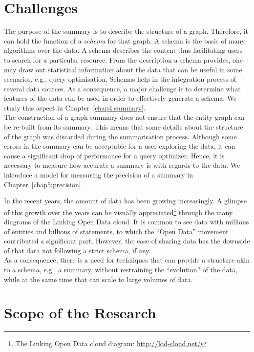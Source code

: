 \section{Challenges}

The purpose of the summary is to describe the structure of a graph. Therefore, it can hold the function of a \emph{schema} for that graph.
A schema is the basis of many algorithms over the data. A schema describes the content thus facilitating users to search for a particular resource. From the description a schema provides, one may draw out statistical information about the data that can be useful in some scenarios, e.g., query optimisation. Schemas help in the integration process of several data sources. As a consequence, a major challenge is to determine what features of the data can be used in order to effectively generate a schema. We study this aspect in Chapter~\ref{chap4:summary}.\\

The construction of a graph summary does not ensure that the entity graph can be re-built from its summary. This means that some details about the structure of the graph was discarded during the summarisation process. Although some errors in the summary can be acceptable for a user exploring the data, it can cause a significant drop of performance for a query optimizer. Hence, it is necessary to measure how accurate a summary is with regards to the data. We introduce a model for measuring the precision of a summary in Chapter~\ref{chap5:precision}.

In the recent years, the amount of data has been growing increasingly. A glimpse of this growth over the years can be visually appreciated\footnote{The Linking Open Data cloud diagram: \url{http://lod-cloud.net/}} through the many diagrams of the Linking Open Data cloud. It is common to see data with millions of entities and billions of statements, to which the ``Open Data'' movement contributed a significant part. However, the ease of sharing data has the downside of that data not following a strict schema, if any.\\

As a consequence, there is a need for techniques that can provide a structure akin to a schema, e.g., a summary, without restraining the ``evolution'' of the data, while at the same time that can scale to large volumes of data.

\section{Scope of the Research}


